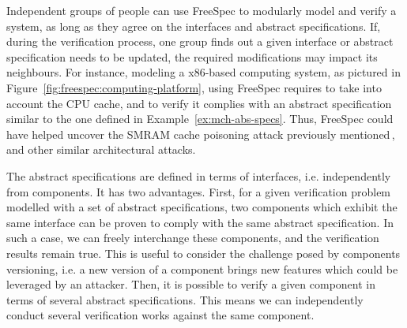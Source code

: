 Independent groups of people can use FreeSpec to modularly model and verify a
system, as long as they agree on the interfaces and abstract specifications.
%
If, during the verification process, one group finds out a given interface or
abstract specification needs to be updated, the required modifications may
impact its neighbours.
%
For instance, modeling a x86-based computing system, as pictured in
Figure~\ref{fig:freespec:computing-platform}, using FreeSpec requires to take
into account the CPU cache, and to verify it complies with an abstract
specification similar to the one defined in Example~\ref{ex:mch-abs-specs}.
%
Thus, FreeSpec could have helped uncover the SMRAM cache poisoning attack
previously mentioned\,\cite{wojtczuk2009smram,duflot2009smram}, and other
similar architectural attacks.

The abstract specifications are defined in terms of interfaces, i.e.
independently from components.
%
It has two advantages.
%
First, for a given verification problem modelled with a set of abstract
specifications, two components which exhibit the same interface can be proven to
comply with the same abstract specification.
%
In such a case, we can freely interchange these components, and the verification
results remain true.
%
This is useful to consider the challenge posed by components versioning, i.e. a
new version of a component brings new features which could be leveraged by an
attacker.
%
Then, it is possible to verify a given component in terms of several abstract
specifications.
%
This means we can independently conduct several verification works against the
same component.
